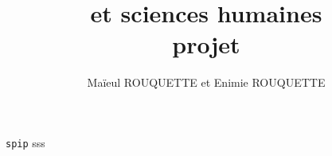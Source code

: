\documentclass[a4paper,11pt]{book}
\begin{document}
\title{\XeLaTeX et sciences humaines \\ projet}
\author{Maïeul ROUQUETTE et Enimie ROUQUETTE}
\date{}



%
\verb|spip| sss
\end{document}
